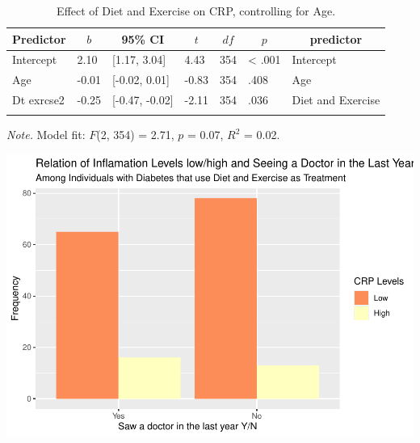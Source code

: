 \documentclass[
  man]{apa6}
\begin{document}
\begin{table}[tbp]

\begin{center}
\begin{threeparttable}

\caption{\label{tab:RQ2}Effect of Diet and Exercise on CRP, controlling for Age.}

\begin{tabular}{lllllll}
\toprule
Predictor & \multicolumn{1}{c}{$b$} & \multicolumn{1}{c}{95\% CI} & \multicolumn{1}{c}{$t$} & \multicolumn{1}{c}{$\mathit{df}$} & \multicolumn{1}{c}{$p$} & \multicolumn{1}{c}{predictor}\\
\midrule
Intercept & 2.10 & {}[1.17, 3.04] & 4.43 & 354 & < .001 & Intercept\\
Age & -0.01 & {}[-0.02, 0.01] & -0.83 & 354 & .408 & Age\\
Dt exrcse2 & -0.25 & {}[-0.47, -0.02] & -2.11 & 354 & .036 & Diet and Exercise\\
\bottomrule
\addlinespace
\end{tabular}

\begin{tablenotes}[para]
\normalsize{\textit{Note.} Model fit: $F$(2, 354) = 2.71, $p$ = 0.07, $R^2$ = 0.02.}
\end{tablenotes}

\end{threeparttable}
\end{center}

\end{table}

\includegraphics{NEW_Final_Groupof5_files/figure-latex/prop-access-bar-1.pdf}
\end{document}
